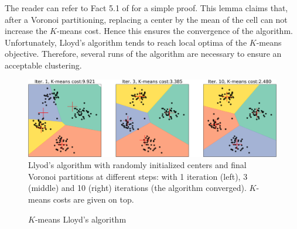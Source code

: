 The reader can refer to Fact 5.1 of \cite{hennig2015handbook} for a simple proof. This lemma claims that, after a Voronoi partitioning, replacing a center by the mean of the cell can not increase the $K$-means cost. Hence this ensures the convergence of the algorithm.
 Unfortunately, Lloyd's algorithm tends to reach local optima of the $K$-means objective. Therefore, several runs of the algorithm are necessary to ensure an acceptable clustering.
 \begin{figure}[h]
 \center
 \includegraphics[scale=0.35]{TeX_files/voronoi_kmeans.png}
 \caption{Llyod's algorithm with randomly initialized centers and final Voronoi partitions at different steps: with 1 iteration (left), 3  (middle) and 10 (right) iterations (the algorithm converged). $K$-means costs are given on top.}
 \label{voronoi_graph}
 \end{figure}
\begin{figure}[h]
\begin{center}
   \caption{$K$-means Lloyd's algorithm}
   \label{algo:lloyd_algo}
\end{center}
\vspace{-15pt}
\end{figure}
